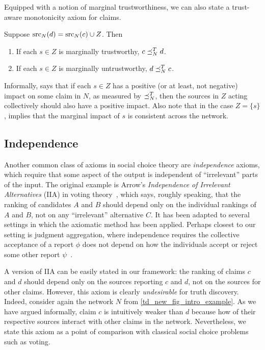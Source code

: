 Equipped with a notion of marginal trustworthiness, we can also state a
trust-aware monotonicity axiom for claims.

\begin{axiom}[\trustbasedmon{}]
    Suppose $\operatorname{src}_N(d) = \operatorname{src}_N(c) \cup Z$. Then
    \begin{enumerate}
        \item If each $s \in Z$ is marginally trustworthy, $c \preceq_N^T d$.
        \item If each $s \in Z$ is marginally untrustworthy, $d \preceq_N^T c$.
    \end{enumerate}
\end{axiom}

Informally, \trustbasedmon{} says that if each $s \in Z$ has a positive (or at
least, not negative) impact on some claim in $N$, as measured by $\preceq_N^T$,
then the sources in $Z$ acting collectively should also have a positive impact.
Also note that in the case $Z = \{s\}$, \trustbasedmon{} implies that the
marginal impact of $s$ is consistent across the network.


\subsection{Independence}
\label{td_new_sec_independence}

Another common class of axioms in social choice theory are \emph{independence}
axioms, which require that some aspect of the output is independent of
``irrelevant'' parts of the input. The original example is Arrow's
\emph{Independence of Irrelevant Alternatives} (IIA) in voting
theory~\cite{arrow1952}, which says, roughly speaking, that the ranking of
candidates $A$ and $B$ should depend only on the individual rankings of $A$ and
$B$, not on any ``irrelevant'' alternative $C$. It has been adapted to several
settings in which the axiomatic method has been applied. Perhaps closest to our
setting is judgment aggregation, where independence requires the collective
acceptance of a report $\phi$ does not depend on how the individuals accept or
reject some other report $\psi$~\cite{endriss2016ja}.

A version of IIA can be easily stated in our framework: the ranking of claims
$c$ and $d$ should depend only on the sources reporting $c$ and $d$, not on the
sources for other claims. However, this axiom is clearly \emph{undesirable} for
truth discovery. Indeed, consider again the network $N$ from
\cref{td_new_fig_intro_example}. As we have argued informally, claim $c$ is
intuitively weaker than $d$ because how of their respective sources interact
with other claims in the network. Nevertheless, we state this axiom as a point
of comparison with classical social choice problems such as voting.

